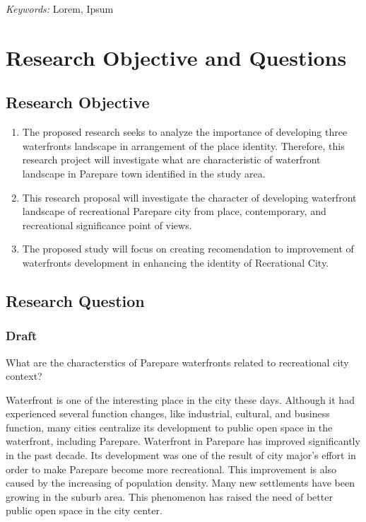 \documentclass[11pt]{simart} %
\begin{document}
\hspace*{3.6mm}\textit{Keywords:} Lorem, Ipsum %

\vspace{30pt} %

\section{Research Objective and Questions}
\subsection{Research Objective}


\begin{enumerate}
\item The proposed research seeks to analyze the importance of developing three waterfronts landscape in arrangement of the place identity. Therefore, this research project will investigate what are characteristic of waterfront landscape in Parepare town identified in the study area.
\item This research proposal will investigate the character of developing waterfront landscape of recreational Parepare city from place, contemporary, and recreational significance point of views.
\item The proposed study will focus on creating recomendation to improvement of waterfronts development in enhancing the identity of Recrational City.

\end{enumerate}

\subsection{Research Question}

\subsubsection{Draft}
What are the characterstics of Parepare waterfronts related to recreational city context?

Waterfront is one of the interesting place in the city these days. Although it had experienced several function changes, like industrial, cultural, and business function, many cities centralize its development to public open space in the waterfront, including Parepare. Waterfront in Parepare has improved significantly in the past decade. Its development was one of the result of city major's effort in order to make Parepare become more recreational. This improvement is also caused by the increasing of population density. Many new settlements have been growing in the suburb area. This phenomenon has raised the need of better public open space in the city center.
\end{document}
